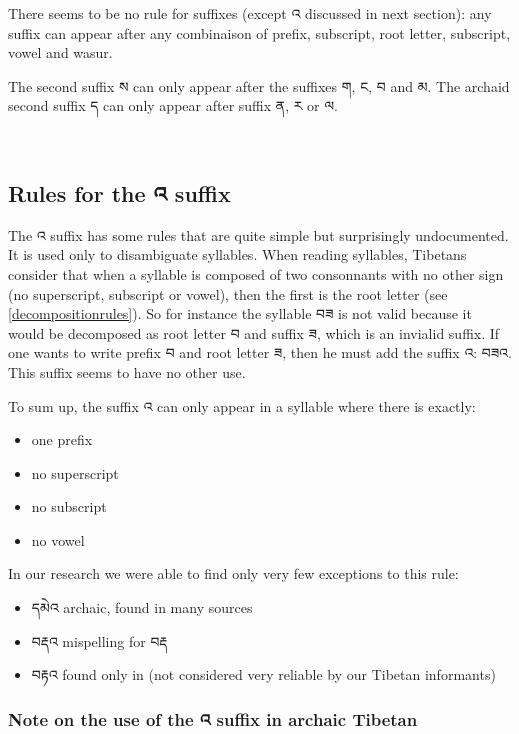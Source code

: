 \documentclass[%
a4paper,%
pagesize,%
12pt,%
parskip=off,%
bibliography=totoc,%
numbers=noenddot,%
DIV=12,%
twoside=semi,%
headings=normal%
]{scrartcl}
\begin{document}
There seems to be no rule for suffixes (except འ discussed in next section): any suffix can appear after any combinaison of prefix, subscript, root letter, subscript, vowel and wasur.

The second suffix ས can only appear after the suffixes ག, ང, བ and མ. The archaid second suffix ད can only appear after suffix ན, ར or ལ.

­\subsection{Rules for the འ suffix}

The འ suffix has some rules that are quite simple but surprisingly undocumented. It is used only to disambiguate syllables. When reading syllables, Tibetans consider that when a syllable is composed of two consonnants with no other sign (no superscript, subscript or vowel), then the first is the root letter (see \ref{decompositionrules}). So for instance the syllable བཟ is not valid because it would be decomposed as root letter བ and suffix ཟ, which is an invialid suffix. If one wants to write prefix བ and root letter ཟ, then he must add the suffix འ: བཟའ. This suffix seems to have no other use. 

To sum up, the suffix འ can only appear in a syllable where there is exactly:

\begin{itemize}
\item one prefix
\item no superscript
\item no subscript
\item no vowel
\end{itemize}

In our research we were able to find only very few exceptions to this rule: 

\begin{itemize}
\item དམེའ archaic, found in many sources
\item བརྡའ mispelling for བརྡ
\item བརྟའ found only in \cite{KhartoTenses} (not considered very reliable by our Tibetan informants)
\end{itemize}

\subsubsection*{Note on the use of the འ suffix in archaic Tibetan}
\end{document}
